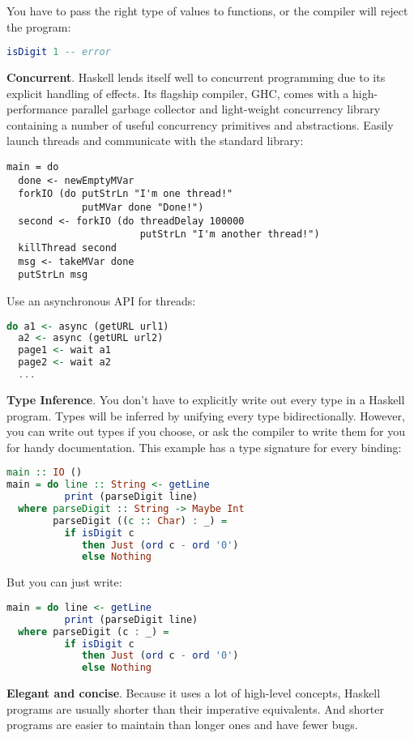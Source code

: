\documentclass{report}
\theoremstyle{definition}
\theoremstyle{definition}
\begin{document}
You have to pass the right type of values to functions, or the compiler will reject the program:
\begin{lstlisting}[language=Haskell, caption=Statically Typed]
isDigit 1 -- error
\end{lstlisting}
\textbf{Concurrent}. Haskell lends itself well to concurrent programming due to its explicit handling of effects. Its flagship compiler, GHC, comes with a high-performance parallel garbage collector and light-weight concurrency library containing a number of useful concurrency primitives and abstractions. Easily launch threads and communicate with the standard library:
\begin{lstlisting}[caption=Concurrent]
main = do
  done <- newEmptyMVar
  forkIO (do putStrLn "I'm one thread!"
             putMVar done "Done!")
  second <- forkIO (do threadDelay 100000
                       putStrLn "I'm another thread!")
  killThread second
  msg <- takeMVar done
  putStrLn msg
\end{lstlisting}
Use an asynchronous API for threads:
\begin{lstlisting}[language=Haskell, caption=Concurrent]
do a1 <- async (getURL url1)
  a2 <- async (getURL url2)
  page1 <- wait a1
  page2 <- wait a2
  ...
\end{lstlisting}
\textbf{Type Inference}. You don't have to explicitly write out every type in a Haskell program. Types will be inferred by unifying every type bidirectionally. However, you can write out types if you choose, or ask the compiler to write them for you for handy documentation. This example has a type signature for every binding:
\begin{lstlisting}[language=Haskell, caption=Type Inference]
main :: IO ()
main = do line :: String <- getLine
          print (parseDigit line)
  where parseDigit :: String -> Maybe Int
        parseDigit ((c :: Char) : _) =
          if isDigit c
             then Just (ord c - ord '0')
             else Nothing
\end{lstlisting}
But you can just write:
\begin{lstlisting}[language=Haskell, caption=Type Inference]
main = do line <- getLine
          print (parseDigit line)
  where parseDigit (c : _) =
          if isDigit c
             then Just (ord c - ord '0')
             else Nothing
\end{lstlisting}
\textbf{Elegant and concise}. Because it uses a lot of high-level concepts, Haskell programs are usually shorter than their imperative equivalents. And shorter programs are easier to maintain than longer ones and have fewer bugs.
\end{document}
